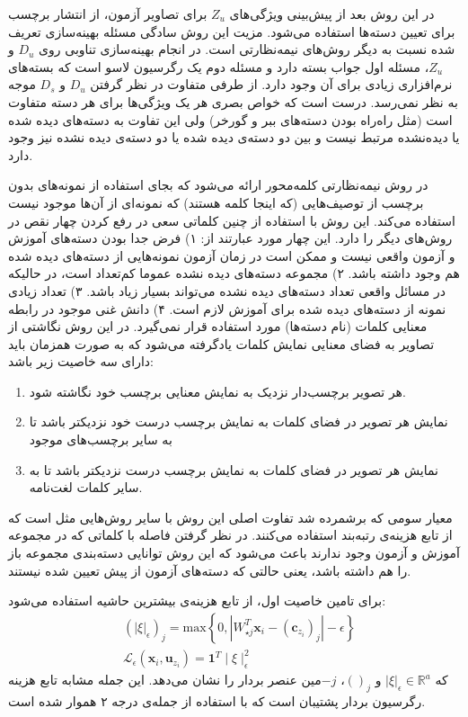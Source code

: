 در این روش بعد از پیش‌بینی ویژگی‌های $Z_u$ برای تصاویر آزمون، از انتشار برچسب برای تعیین دسته‌ها استفاده می‌شود. مزیت این روش سادگی مسئله بهینه‌سازی تعریف شده نسبت به دیگر روش‌های نیمه‌نظارتی است. در انجام بهینه‌سازی تناوبی روی $D_u$ و $Z_u$، مسئله اول جواب بسته دارد و مسئله دوم یک رگرسیون لاسو است که بسته‌های نرم‌افزاری زیادی برای آن وجود دارد. از طرفی متفاوت در نظر گرفتن $D_u$ و $D_s$ موجه به نظر نمی‌رسد. درست است که خواص بصری هر یک ویژگی‌ها برای هر دسته متفاوت است (مثل راه‌راه  بودن دسته‌های ببر و گورخر) ولی این تفاوت به دسته‌های دیده شده یا دیده‌نشده مرتبط نیست و بین دو دسته‌ی دیده شده یا دو دسته‌ی دیده نشده نیز وجود دارد.

در \cite{Fu2016} روش نیمه‌نظارتی کلمه‌محور   ارائه می‌شود که بجای استفاده از نمونه‌های بدون برچسب از توصیف‌هایی (که اینجا کلمه هستند) که نمونه‌ای از آن‌ها موجود نیست استفاده می‌کند. این روش با استفاده از چنین کلماتی سعی در رفع کردن چهار نقص در روش‌های دیگر را دارد. این چهار مورد عبارتند از: ۱) فرض جدا بودن دسته‌های آموزش و آزمون واقعی نیست و ممکن است در زمان آزمون نمونه‌هایی از دسته‌های دیده شده هم وجود داشته باشد. ۲) مجموعه دسته‌های دیده نشده عموما کم‌تعداد است، در حالیکه در مسائل واقعی تعداد دسته‌های دیده نشده می‌تواند بسیار زیاد باشد. ۳) تعداد زیادی نمونه از دسته‌های دیده شده برای آموزش لازم است. ۴) دانش غنی موجود در رابطه معنایی کلمات (نام دسته‌ها) مورد استفاده قرار نمی‌گیرد. 
در این روش نگاشتی از تصاویر به فضای معنایی نمایش کلمات یادگرفته می‌شود که به صورت همزمان باید دارای سه خاصیت زیر باشد:
\begin{enumerate}
\item هر تصویر برچسب‌دار نزدیک به نمایش معنایی برچسب خود نگاشته شود.
\item 
نمایش هر تصویر در فضای کلمات به نمایش برچسب درست خود نزدیکتر باشد تا به سایر برچسب‌های موجود
\item 
نمایش هر تصویر در فضای کلمات به نمایش برچسب درست نزدیکتر باشد تا به سایر کلمات لغت‌نامه.
\end{enumerate}
معیار سومی که برشمرده شد تفاوت اصلی این روش با سایر روش‌هایی مثل
\cite{devise}
است که از تابع هزینه‌ی رتبه‌بند استفاده می‌کنند. در نظر گرفتن فاصله با کلماتی که در مجموعه آموزش و آزمون وجود ندارند باعث می‌شود که این روش توانایی دسته‌بندی مجموعه باز 
 را هم داشته باشد، یعنی حالتی که دسته‌های آزمون از پیش تعیین شده نیستند.
  
 برای تامین خاصیت اول، از تابع هزینه‌ی بیشترین حاشیه استفاده می‌شود:
\begin{align}
\label{eq:svr}
&\left(|\xi|_{\epsilon}\right)_{j} =\mathrm{max}\left\{ 0,|W_{\star j}^{T}\mathbf{x}_{i}-\left(\mathbf{\mathbf{c}}_{z_{i}}\right)_{j}|-\epsilon\right\} \\
&\mathcal{L}_{\epsilon}\left(\mathbf{x}_{i},\mathbf{u}_{z_{i}}\right) =\mathbf{1}^{T}\mid\xi\mid_{\epsilon}^{2} 
\end{align}
که
 $|\xi|_{\epsilon}\in\mathbb{R}^{a}$
و 
$()_j$،
$-j$مین 
عنصر بردار را نشان می‌دهد. این جمله  مشابه تابع هزینه رگرسیون بردار پشتیبان 
  است که با استفاده از جمله‌ی درجه ۲ هموار شده است.
  
